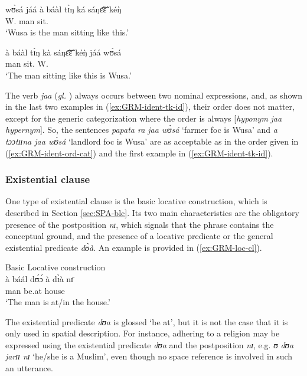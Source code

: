\gll
wʊ̀sá jáá  à báàl tɪ̀ŋ ká sáŋɛ̃̄ɛ̃̄ kéŋ̀ \\
W. {\ident} {\art} man {\art} {\egr} sit.{\pfv} {\dxm}\\
\glt `Wusa is the man sitting like this.'

\gll
à báàl tɪ̀ŋ kà sáŋɛ̃̄ɛ̃̄ kéŋ̀  jáá wʊ̀sá  \\
 {\art} man {\art} {\egr} sit.{\pfv} {\dxm} {\ident}   W. \\
\glt `The man sitting like this is Wusa.'



\z 
 \z

The verb {\it jaa}  ({\it gl.} {\ident}) always  occurs between two nominal  
expressions,  and, as shown in the last two examples in 
(\ref{ex:GRM-ident-tk-id}),  their order  does not matter, except for the 
generic categorization where the order is always [{\it hyponym} {\it jaa} {\it 
hypernym}].  So,  the sentences {\it papata ra jaa  wʊ̀sá} `farmer {\sc foc} 
is Wusa' and 
{\it 
a 
tɔɔtɪɪna  jaa  wʊ̀sá} `landlord {\sc foc} is Wusa'   are  as acceptable as in 
the 
order given in (\ref{ex:GRM-ident-ord-cat}) and the first example in 
(\ref{ex:GRM-ident-tk-id}).    



\subsubsection{Existential clause} 
\label{sec:GRM-loc-cl}

One type of existential clause is the basic  locative construction, which is
described in Section \ref{sec:SPA-blc}. Its
two main characteristics are the obligatory presence of the postposition {\it 
nɪ},  which signals that the phrase contains the conceptual ground, and the
presence of a locative predicate or the general existential predicate {\it 
dʊ̀à}. An example is provided in (\ref{ex:GRM-loc-cl}).

\ea\label{ex:GRM-loc-cl}{\rm Basic Locative construction}\\
\gll à báál dʊ́ɔ́ à dɪ̀à nɪ̄\\
{\art}  man be.at {\art} house {\postp}\\
 \glt  `The man is at/in the house.'
\z

The existential predicate {\it dʊa} is glossed `be at', but it is not the case
that it is only used in spatial description. For instance,  adhering to a
religion may be expressed using the existential predicate {\it dʊa} and the
postposition {\it nɪ}, e.g.  {\it ʊ dʊa jarɪɪ nɪ} `he/she is a Muslim', even
though no space reference is involved in such an utterance. 

